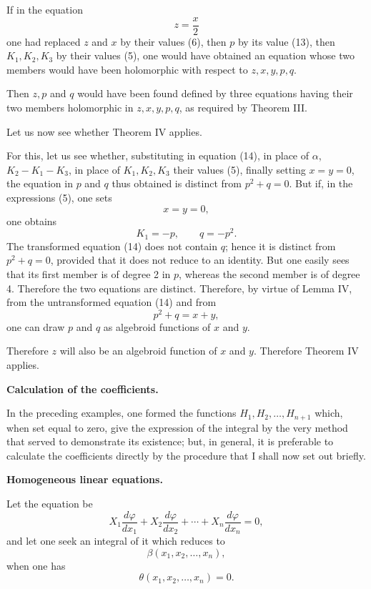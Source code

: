 \documentclass[11pt]{article}
\begin{document}
If in the equation
\[
z=\frac{x}{2}
\]
one had replaced $z$ and $x$ by their values (6), then $p$ by its value (13), then $K_1,K_2,K_3$ by their values (5), one would have obtained an equation whose two members would have been holomorphic with respect to $z,x,y,p,q$.

Then $z,p$ and $q$ would have been found defined by three equations having their two members holomorphic in $z,x,y,p,q$, as required by Theorem III.

Let us now see whether Theorem IV applies.

For this, let us see whether, substituting in equation (14), in place of $\alpha$, $K_2-K_1-K_3$, in place of $K_1,K_2,K_3$ their values (5), finally setting $x=y=0$, the equation in $p$ and $q$ thus obtained is distinct from $p^2+q=0$. But if, in the expressions (5), one sets
\[
x=y=0,
\]
one obtains
\[
K_1=-p,
\qquad q=-p^2.
\]
The transformed equation (14) does not contain $q$; hence it is distinct from $p^2+q=0$, provided that it does not reduce to an identity. But one easily sees that its first member is of degree 2 in $p$, whereas the second member is of degree 4. Therefore the two equations are distinct. Therefore, by virtue of Lemma IV, from the untransformed equation (14) and from
\[
p^2+q=x+y,
\]
one can draw $p$ and $q$ as algebroid functions of $x$ and $y$.

Therefore $z$ will also be an algebroid function of $x$ and $y$. Therefore Theorem IV applies.



\begin{center}
{\bfseries Calculation of the coefficients.}
\end{center}

In the preceding examples, one formed the functions $H_1,H_2,\ldots,H_{n+1}$ which, when set equal to zero, give the expression of the integral by the very method that served to demonstrate its existence; but, in general, it is preferable to calculate the coefficients directly by the procedure that I shall now set out briefly.

\begin{center}
{\bfseries Homogeneous linear equations.}
\end{center}

Let the equation be
\[
X_1\frac{d\varphi}{dx_1}+X_2\frac{d\varphi}{dx_2}+\cdots+X_n\frac{d\varphi}{dx_n}=0,
\]
and let one seek an integral of it which reduces to
\[
\beta(x_1,x_2,\ldots,x_n),
\]
when one has
\[
\theta(x_1,x_2,\ldots,x_n)=0.
\]
\end{document}
